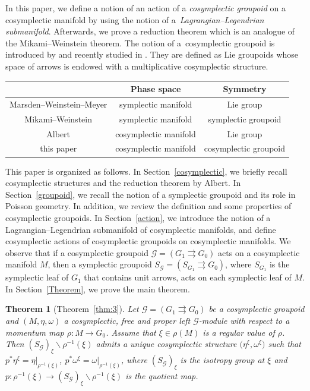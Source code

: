 \documentclass[pdftex]{sigma}
\numberwithin{equation}{section}
\newtheorem{Theorem}{Theorem}[section]
\begin{document}
In this paper, we define a notion of an action of a \textit{cosymplectic groupoid} on a cosymplectic manifold by using the notion of a~\textit{Lagrangian--Legendrian submanifold}. Afterwards, we prove a reduction theorem which is an analogue of the Mikami--Weinstein theorem. The notion of a~cosymplectic groupoid is introduced by \cite{djiba2015cosymplectic} and recently studied in \cite{fernandes2023cosymplectic}. They are defined as Lie groupoids whose space of arrows is endowed with a multiplicative cosymplectic structure.

\begin{table}[htbp]\renewcommand{\arraystretch}{1.2}
 \centering
 \begin{tabular}{|c||c|c|}
 \hline
 &Phase space&Symmetry\\ \hline
 Marsden--Weinstein--Meyer &symplectic manifold& Lie group\\
 Mikami--Weinstein &symplectic manifold & symplectic groupoid \\
 Albert & cosymplectic manifold & Lie group\\
 this paper&cosymplectic manifold &cosymplectic groupoid \\ \hline
 \end{tabular}
\end{table}

This paper is organized as follows. In Section~\ref{cosymplectic}, we briefly recall cosymplectic structures and the reduction theorem by Albert. In Section~\ref{groupoid}, we recall the notion of a symplectic groupoid and its role in Poisson geometry. In addition, we review the definition and some properties of cosymplectic groupoids. In Section~\ref{action}, we introduce the notion of a Lagrangian--Legendrian submanifold of cosymplectic manifolds, and define cosymplectic actions of cosymplectic groupoids on cosymplectic manifolds. We observe that if a cosymplectic groupoid $\mathcal{G}=(G_1\rightrightarrows G_0)$ acts on a cosymplectic manifold $M$, then a symplectic groupoid $S_\mathcal{G}=(S_{G_1}\rightrightarrows G_0)$, where $S_{G_1}$ is the symplectic leaf of $G_1$ that contains unit arrows, acts on each symplectic leaf of $M$. In Section~\ref{Theorem}, we prove the main theorem.

\begin{Theorem}[Theorem~\ref{thm:3}]
 Let $\mathcal{G}=(G_1\rightrightarrows G_0)$ be a cosymplectic groupoid and $(M,\eta,\omega)$ a cosymplectic, free and proper left $\mathcal{G}$-module with respect to a momentum map $\rho\colon M\to G_0$. Assume that $\xi\in\rho(M)$ is a regular value of $\rho$. Then $(S_{\mathcal{G}})_\xi\backslash \rho^{-1}(\xi)$ admits a unique cosymplectic structure $\bigl(\eta^\xi,\omega^\xi\bigr)$ such that $p^\ast\eta^\xi=\eta|_{\rho^{-1}(\xi)}$, $ p^\ast\omega^\xi=\omega|_{\rho^{-1}(\xi)}$, where $(S_{\mathcal{G}})_\xi$ is the isotropy group at $\xi$ and $p\colon\rho^{-1}(\xi)\to (S_{\mathcal{G}})_\xi\backslash \rho^{-1}(\xi)$ is the quotient map.
\end{Theorem}
\end{document}
